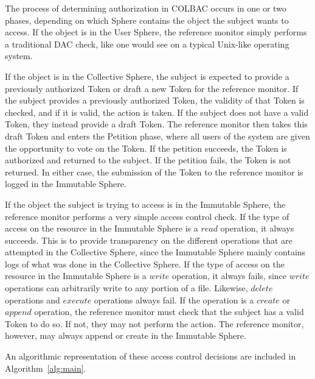 The process of determining authorization in COLBAC occurs in one or two phases,
depending on which Sphere contains the object the subject wants to access.
If the object is in the User Sphere, the reference monitor simply performs a
traditional DAC check, like one would see on a typical Unix-like operating
system.

If the object is in the Collective Sphere, the subject is expected to
provide a previously authorized Token or draft a new Token for the reference
monitor. If the subject provides a previously authorized Token, the validity of
that Token is checked, and if it is valid, the action is taken. If
the subject does not have a valid Token, they instead provide a draft Token. The
reference monitor then takes this draft Token and enters the Petition phase,
where all users of the system are given the opportunity to vote on the Token. If
the petition succeeds, the Token is authorized and returned to the subject. If
the petition fails, the Token is not returned. In either case, the submission of
the Token to the reference monitor is logged in the Immutable Sphere.

If the object the subject is trying to access is in the Immutable Sphere, the
reference monitor performs a very simple access control check. If the type of
access on the resource in the Immutable Sphere is a $read$ operation, it always
succeeds. This
is to provide transparency on the different operations that are attempted in
the Collective Sphere, since the Immutable Sphere mainly contains logs of what
was done in the Collective Sphere. If the type of access on the resource in the
Immutable Sphere is a $write$ operation, it always fails, since $write$
operations can arbitrarily write to any portion of a file. Likewise, $delete$
operations and $execute$ operations always fail. If the operation is a
$create$ or $append$ operation, the reference monitor must check that the
subject has a valid Token to do so. If not, they may not perform the action.
The reference monitor, however, may always append or create in the Immutable
Sphere.

An algorithmic representation of these access control decisions are included in
Algorithm~\ref{alg:main}.

